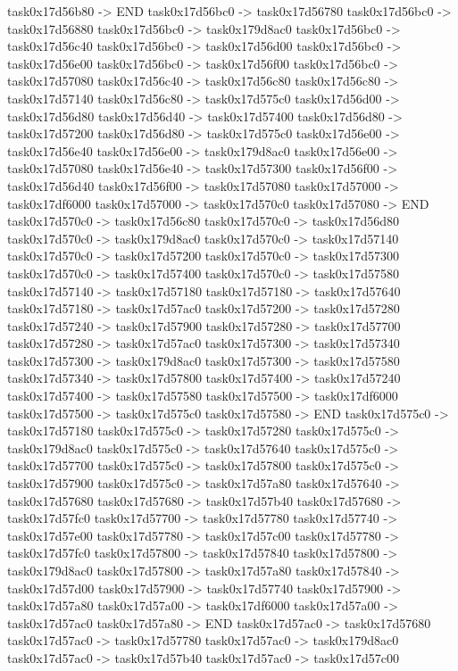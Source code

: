 {	task0x17d56b80 -> END
	task0x17d56bc0 -> task0x17d56780
	task0x17d56bc0 -> task0x17d56880
	task0x17d56bc0 -> task0x179d8ac0
	task0x17d56bc0 -> task0x17d56c40
	task0x17d56bc0 -> task0x17d56d00
	task0x17d56bc0 -> task0x17d56e00
	task0x17d56bc0 -> task0x17d56f00
	task0x17d56bc0 -> task0x17d57080
	task0x17d56c40 -> task0x17d56c80
	task0x17d56c80 -> task0x17d57140
	task0x17d56c80 -> task0x17d575c0
	task0x17d56d00 -> task0x17d56d80
	task0x17d56d40 -> task0x17d57400
	task0x17d56d80 -> task0x17d57200
	task0x17d56d80 -> task0x17d575c0
	task0x17d56e00 -> task0x17d56e40
	task0x17d56e00 -> task0x179d8ac0
	task0x17d56e00 -> task0x17d57080
	task0x17d56e40 -> task0x17d57300
	task0x17d56f00 -> task0x17d56d40
	task0x17d56f00 -> task0x17d57080
	task0x17d57000 -> task0x17df6000
	task0x17d57000 -> task0x17d570c0
	task0x17d57080 -> END
	task0x17d570c0 -> task0x17d56c80
	task0x17d570c0 -> task0x17d56d80
	task0x17d570c0 -> task0x179d8ac0
	task0x17d570c0 -> task0x17d57140
	task0x17d570c0 -> task0x17d57200
	task0x17d570c0 -> task0x17d57300
	task0x17d570c0 -> task0x17d57400
	task0x17d570c0 -> task0x17d57580
	task0x17d57140 -> task0x17d57180
	task0x17d57180 -> task0x17d57640
	task0x17d57180 -> task0x17d57ac0
	task0x17d57200 -> task0x17d57280
	task0x17d57240 -> task0x17d57900
	task0x17d57280 -> task0x17d57700
	task0x17d57280 -> task0x17d57ac0
	task0x17d57300 -> task0x17d57340
	task0x17d57300 -> task0x179d8ac0
	task0x17d57300 -> task0x17d57580
	task0x17d57340 -> task0x17d57800
	task0x17d57400 -> task0x17d57240
	task0x17d57400 -> task0x17d57580
	task0x17d57500 -> task0x17df6000
	task0x17d57500 -> task0x17d575c0
	task0x17d57580 -> END
	task0x17d575c0 -> task0x17d57180
	task0x17d575c0 -> task0x17d57280
	task0x17d575c0 -> task0x179d8ac0
	task0x17d575c0 -> task0x17d57640
	task0x17d575c0 -> task0x17d57700
	task0x17d575c0 -> task0x17d57800
	task0x17d575c0 -> task0x17d57900
	task0x17d575c0 -> task0x17d57a80
	task0x17d57640 -> task0x17d57680
	task0x17d57680 -> task0x17d57b40
	task0x17d57680 -> task0x17d57fc0
	task0x17d57700 -> task0x17d57780
	task0x17d57740 -> task0x17d57e00
	task0x17d57780 -> task0x17d57c00
	task0x17d57780 -> task0x17d57fc0
	task0x17d57800 -> task0x17d57840
	task0x17d57800 -> task0x179d8ac0
	task0x17d57800 -> task0x17d57a80
	task0x17d57840 -> task0x17d57d00
	task0x17d57900 -> task0x17d57740
	task0x17d57900 -> task0x17d57a80
	task0x17d57a00 -> task0x17df6000
	task0x17d57a00 -> task0x17d57ac0
	task0x17d57a80 -> END
	task0x17d57ac0 -> task0x17d57680
	task0x17d57ac0 -> task0x17d57780
	task0x17d57ac0 -> task0x179d8ac0
	task0x17d57ac0 -> task0x17d57b40
	task0x17d57ac0 -> task0x17d57c00
}
